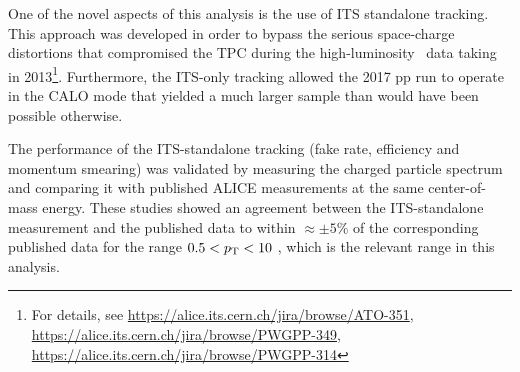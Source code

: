 

One of the novel aspects of this analysis is the use of ITS standalone tracking. This approach was developed in order to bypass the serious space-charge distortions that compromised the TPC during the high-luminosity \pPb~data taking in 2013\footnote{For details, see \url{https://alice.its.cern.ch/jira/browse/ATO-351}, \url{https://alice.its.cern.ch/jira/browse/PWGPP-349},
\url{https://alice.its.cern.ch/jira/browse/PWGPP-314}
}. Furthermore, the ITS-only tracking allowed the 2017 pp run to operate in the CALO mode that yielded a much larger sample than would have been possible otherwise. 

The performance of the ITS-standalone tracking (fake rate, efficiency and momentum smearing) was validated by measuring the charged particle spectrum and comparing it with published ALICE measurements at the same center-of-mass energy. These studies showed an agreement between the ITS-standalone measurement and the published data to within $\approx \pm 5\%$ of the corresponding published data for the range {$0.5<p_{\mathrm{T}}<10$ \GeVc}, which is the relevant range in this analysis. 

